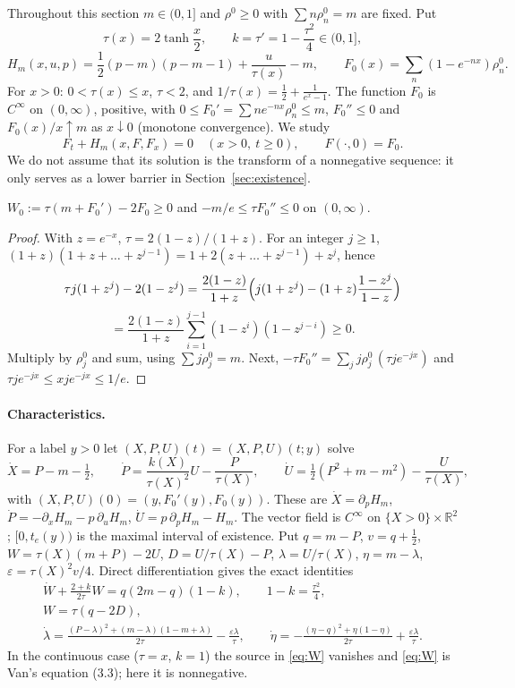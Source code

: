 \documentclass[11pt,a4paper]{report}
\newcommand{\eps}{\varepsilon}
\begin{document}
Throughout this section \(m\in(0,1]\) and \(\rho^0\ge0\) with \(\sum n\rho^0_n=m\) are fixed. Put
\[
\tau(x)=2\tanh\frac x2,\qquad k=\tau'=1-\frac{\tau^2}4\in(0,1],
\]
\[
H_m(x,u,p)=\frac12(p-m)(p-m-1)+\frac{u}{\tau(x)}-m,\qquad
F_0(x)=\sum_n(1-e^{-nx})\rho^0_n .
\]
For \(x>0\): \(0<\tau(x)\le x\), \(\tau<2\), and \(1/\tau(x)=\frac12+\frac1{e^x-1}\). The function \(F_0\) is
\(C^\infty\) on \((0,\infty)\), positive, with \(0\le F_0'=\sum ne^{-nx}\rho^0_n\le m\), \(F_0''\le0\) and
\(F_0(x)/x\uparrow m\) as \(x\downarrow0\) (monotone convergence). We study
\begin{equation}\label{eq:HJ}
F_t+H_m(x,F,F_x)=0\quad(x>0,\ t\ge0),\qquad F(\cdot,0)=F_0 .
\end{equation}
We do not assume that its solution is the transform of a nonnegative sequence: it only serves as a lower
barrier in Section~\ref{sec:existence}.

\begin{lemma}\label{lem:initial}
\(W_0:=\tau(m+F_0')-2F_0\ge0\) and \(-m/e\le\tau F_0''\le0\) on \((0,\infty)\).
\end{lemma}
\begin{proof}
With \(z=e^{-x}\), \(\tau=2(1-z)/(1+z)\). For an integer \(j\ge1\),
\((1+z)(1+z+\dots+z^{j-1})=1+2(z+\dots+z^{j-1})+z^j\), hence
\[
\tau j(1+z^j)-2(1-z^j)=\frac{2(1-z)}{1+z}\Bigl(j(1+z^j)-(1+z)\frac{1-z^j}{1-z}\Bigr)
\]
\[
=\frac{2(1-z)}{1+z}\sum_{i=1}^{j-1}(1-z^i)(1-z^{j-i})\ge0 .
\]
Multiply by \(\rho^0_j\) and sum, using \(\sum j\rho^0_j=m\). Next,
\(-\tau F_0''=\sum_j j\rho^0_j\,(\tau je^{-jx})\) and \(\tau je^{-jx}\le xje^{-jx}\le1/e\).
\end{proof}

\paragraph{Characteristics.}
For a label \(y>0\) let \((X,P,U)(t)=(X,P,U)(t;y)\) solve
\begin{equation}\label{eq:char}
\dot X=P-m-\tfrac12,\qquad
\dot P=\frac{k(X)}{\tau(X)^2}U-\frac{P}{\tau(X)},\qquad
\dot U=\tfrac12(P^2+m-m^2)-\frac{U}{\tau(X)},
\end{equation}
with \((X,P,U)(0)=(y,F_0'(y),F_0(y))\). These are
\(\dot X=\partial_pH_m\), \(\dot P=-\partial_xH_m-p\,\partial_uH_m\), \(\dot U=p\,\partial_pH_m-H_m\).
The vector field is \(C^\infty\) on \(\{X>0\}\times\mathbb R^2\); \([0,t_e(y))\) is the maximal interval of
existence. Put \(q=m-P\), \(v=q+\frac12\), \(W=\tau(X)(m+P)-2U\), \(D=U/\tau(X)-P\), \(\lambda=U/\tau(X)\),
\(\eta=m-\lambda\), \(\eps=\tau(X)^2v/4\). Direct differentiation gives the exact identities
\begin{gather}
\dot W+\frac{2+k}{2\tau}W=q(2m-q)(1-k),\qquad 1-k=\frac{\tau^2}4,\label{eq:W}\\
W=\tau(q-2D),\label{eq:WD}\\
\dot\lambda=\frac{(P-\lambda)^2+(m-\lambda)(1-m+\lambda)}{2\tau}-\frac{\eps\lambda}{\tau},\qquad
\dot\eta=-\frac{(\eta-q)^2+\eta(1-\eta)}{2\tau}+\frac{\eps\lambda}{\tau}.\label{eq:lambda}
\end{gather}
In the continuous case (\(\tau=x\), \(k=1\)) the source in \eqref{eq:W} vanishes and \eqref{eq:W} is Van's
equation (3.3); here it is nonnegative.
\end{document}
